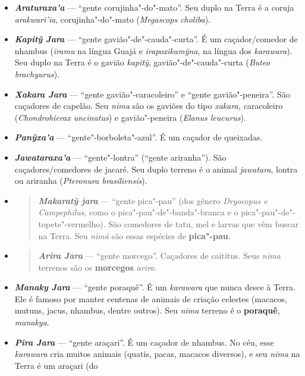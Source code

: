 \begin{itemize}
{  mihua} (gente brava e selvagem do céu).
\item
  \textbf{\emph{Araturaxa'a}} --- ``gente corujinha"-do"-mato''. Seu duplo
  na Terra é a coruja \emph{arakwari'ia}, corujinha"-do"-mato
  (\emph{Megascops choliba}).
\item
  \emph{\textbf{Kapitỹ Jara}} --- ``gente gavião"-de"-cauda"-curta''. É um
  caçador/comedor de nhambus (\emph{iramu} na língua Guajá e
  \emph{irapoxikamỹna}, na língua dos \emph{karawara}). Seu duplo na
  Terra é o gavião \emph{kapitỹ}, gavião"-de"-cauda"-curta (\emph{Buteo
  brachyurus}).
\item
  \emph{\textbf{Xakara Jara}} --- ``gente gavião"-caracoleiro'' e ``gente
  gavião"-peneira''. São caçadores de capelão. Seu \emph{nima} são os
  gaviões do tipo \emph{xakara,} caracoleiro (\emph{Chondrohierax
  uncinatus}) e gavião"-peneira (\emph{Elanus leucurus}).
\item
  \emph{\textbf{Panỹxa'a}} --- ``gente"-borboleta"-azul''. É um caçador de
  queixadas.
\item
  \emph{\textbf{Jawataraxa'a}} --- ``gente"-lontra'' (``gente ariranha'').
  São caçadores/comedores de jacaré. Seu duplo terreno é o animal
  \emph{jawatara}, lontra ou ariranha (\emph{Pteronura brasiliensis}).
\item
  \begin{quote}
  \emph{\textbf{Makaratỹ jara}} --- ``gente pica"-pau'' (dos gênero
  \emph{Dryocopus e Campephilus}, como o pica"-pau"-de"-banda"-branca e o
  pica"-pau"-de"-topete"-vermelho). São comedores de tatu, mel e larvas que
  vêm buscar na Terra. Seu \emph{nimá} são essas espécies de
  \textbf{pica"-pau}.
  \end{quote}
\item
  \begin{quote}
  \textbf{\emph{Arira} \emph{Jara}} --- ``gente morcego''. Caçadores de
  caititus. Seus \emph{nima} terrenos são os \textbf{morcegos}
  \emph{arira}.
  \end{quote}
\item
  \emph{\textbf{Manaky Jara}} --- ``gente poraquê''. É um \emph{karawara}
  que nunca desce à Terra. Ele é famoso por manter centenas de animais
  de criação celestes (macacos, mutuns, jacus, nhambus, dentre outros).
  Seu \emph{nima} terreno é o \textbf{poraquê}, \emph{manakya}.
\item
  \emph{\textbf{Pira Jara}} --- ``gente araçari''. É um caçador de
  nhambus. No céu, esse \emph{karawara} cria muitos animais (quatis,
  pacas, macacos diversos), e seu \emph{nima} na Terra é um araçari (do

\end{itemize}
